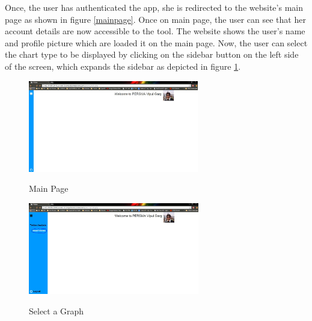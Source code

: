 \documentclass[12pt]{ucthesis}
\newcommand{\captionfonts}{\small\bf\ssp}
\begin{document}
Once, the user has authenticated the app, she is redirected to the website's main page as shown in figure \ref{mainpage}. Once on main page, the user can see that her account details are now accessible to the tool. The website shows the user's name and profile picture which are loaded it on the main page. Now, the user can select the chart type to be displayed by clicking on the sidebar button on the left side of the screen, which expands the sidebar as depicted in figure \ref{selectgraph}.\\
\begin{figure}[!htb]
\centering
\begin{minipage}[b]{0.45\linewidth}
\includegraphics[height=40mm]{mainpage.JPG}
\captionfonts
\caption[Main Page]{Main Page}
\label{mainpage}
\end{minipage}%
\begin{minipage}[b]{0.45\linewidth}
\includegraphics[height=40mm]{select_graph.JPG}
\captionfonts
\caption[Select a Graph]{Select a Graph}
\label{selectgraph}
\end{minipage}%
\end{figure}
\end{document}

